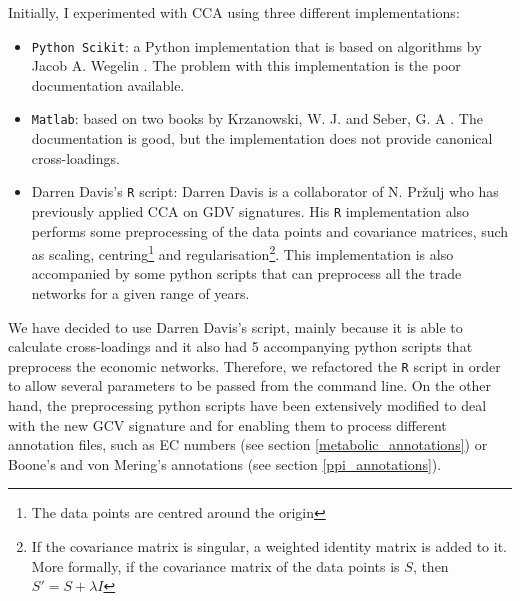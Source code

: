 Initially, I experimented with CCA using three different implementations:
\begin{itemize}
 \item \lstinline|Python Scikit|: a Python implementation that is based on algorithms by Jacob A. Wegelin \cite{wegelin2000survey}. The problem with this implementation is the poor documentation available.
 \item \lstinline|Matlab|: based on two books by Krzanowski, W. J. \cite{krzanowski2000principles} and Seber, G. A \cite{seber2009multivariate}. The documentation is good, but the implementation does not provide canonical cross-loadings.
 \item Darren Davis's \lstinline|R| script: Darren Davis is a collaborator of N. Pr\v{z}ulj who has previously applied CCA on GDV signatures. His \lstinline|R| implementation also performs some preprocessing of the data points and covariance matrices, such as scaling, centring\footnote{The data points are centred around the origin} and regularisation\footnote{If the covariance matrix is singular, a weighted identity matrix is added to it. More formally, if the covariance matrix of the data points is $S$, then $S' = S + \lambda I$}. This implementation is also accompanied by some python scripts that can preprocess all the trade networks for a given range of years.
\end{itemize}

We have decided to use Darren Davis's script, mainly because it is able to calculate cross-loadings and it also had 5 accompanying python scripts that preprocess the economic networks. Therefore, we refactored the \lstinline|R| script in order to allow several parameters to be passed from the command line. On the other hand, the preprocessing python scripts have been extensively modified to deal with the new GCV signature and for enabling them to process different annotation files, such as EC numbers (see section \ref{metabolic_annotations}) or Boone's and von Mering's annotations (see section \ref{ppi_annotations}).



